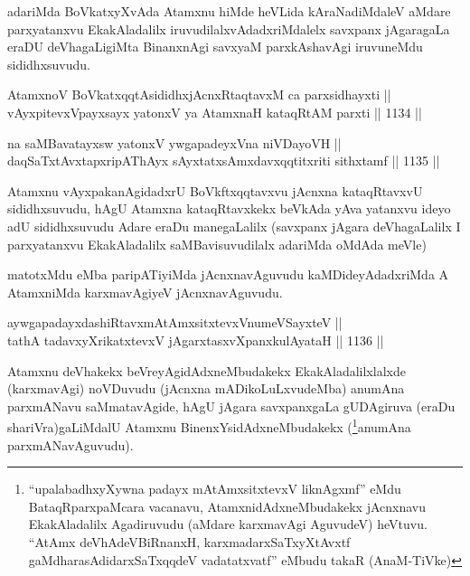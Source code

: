\begin{artha}
adariMda BoVkatxyXvAda Atamxnu hiMde heVLida kAraNadiMdaleV aMdare parxyatanxvu EkakAladalilx iruvudilalxvAdadxriMdalelx savxpanx jAgaragaLa eraDU deVhagaLigiMta BinanxnAgi savxyaM parxkAshavAgi iruvuneMdu sididhxsuvudu.
\end{artha}


\begin{shl}
\footnotemark[1]AtamxnoV BoVkatxqqtAsididhxjAcnxRtaqtavxM ca parxsidhayxti || \\
vAyxpitevxV\s payxsayx yatonxV ya AtamxnaH kataqRtAM parxti \hfill || 1134 ||  
\end{shl}
				
\begin{shl}
na saMBavatayxsw yatonxV ywgapadeyxVna niVDayoVH || \\
daqSaTxtAvxtapxripAThAyx sAyxtatxsAmxdavxqqtitxriti sithxtamf \hfill || 1135 ||  
\end{shl}

\begin{artha}
Atamxnu vAyxpakanAgidadxrU BoVkftxqqtavxvu jAcnxna kataqRtavxvU sididhxsuvudu, hAgU Atamxna kataqRtavxkekx beVkAda yAva yatanxvu ideyo adU sididhxsuvudu Adare eraDu manegaLalilx (savxpanx jAgara deVhagaLalilx I parxyatanxvu EkakAladalilx saMBavisuvudilalx adariMda oMdAda meVle)
\end{artha}

\begin{artha}
matotxMdu eMba paripATiyiMda jAcnxnavAguvudu kaMDideyAdadxriMda A AtamxniMda karxmavAgiyeV jAcnxnavAguvudu.
\end{artha}

\begin{shl}
aywgapadayxdashiRtavxmAtAmxsitxtevxV\s numeVSayxteV || \\
tathA tadavxyXrikatxtevxV jAgarxtasxvXpanxkulAyataH \hfill || 1136 ||  
\end{shl}

\begin{artha}
Atamxnu deVhakekx beVreyAgidAdxneMbudakekx EkakAladalilxlalxde (karxmavAgi) noVDuvudu (jAcnxna mADikoLuLxvudeMba) anumAna parxmANavu saMmatavAgide, hAgU jAgara savxpanxgaLa gUDAgiruva (eraDu shariVra)gaLiMdalU Atamxnu BinenxYsidAdxneMbudakekx (\footnote{``upalabadhxyXywna padayx mAtAmxsitxtevxV liknAgxmf'' eMdu BataqRparxpaMcara vacanavu, AtamxnidAdxneMbudakekx jAcnxnavu EkakAladalilx Agadiruvudu (aMdare karxmavAgi AguvudeV) heVtuvu. ``AtAmx deVhAdeVBiRnanxH, karxmadarxSaTxyXtAvxtf gaMdharasAdidarxSaTxqqdeV vadatatxvatf'' eMbudu takaR (AnaM-TiVke)}anumAna parxmANavAguvudu).
\end{artha}

